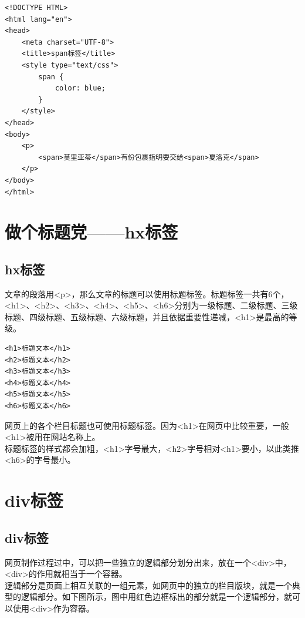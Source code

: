 \begin{lstlisting}[style=htmlcssjs]
<!DOCTYPE HTML>
<html lang="en">
<head>
    <meta charset="UTF-8">
    <title>span标签</title>
    <style type="text/css">
        span {
            color: blue;
        }
    </style>
</head>
<body>
    <p>
        <span>莫里亚蒂</span>有份包裹指明要交给<span>夏洛克</span>
    </p>
</body>
</html>
\end{lstlisting}

\newpage

\section{做个标题党——hx标签}

\subsection{hx标签}

文章的段落用<p>，那么文章的标题可以使用标题标签。标题标签一共有6个，<h1>、<h2>、<h3>、<h4>、<h5>、<h6>分别为一级标题、二级标题、三级标题、四级标题、五级标题、六级标题，并且依据重要性递减，<h1>是最高的等级。 \\

\begin{lstlisting}[style=htmlcssjs]
<h1>标题文本</h1>
<h2>标题文本</h2>
<h3>标题文本</h3>
<h4>标题文本</h4>
<h5>标题文本</h5>
<h6>标题文本</h6>
\end{lstlisting}

网页上的各个栏目标题也可使用标题标签。因为<h1>在网页中比较重要，一般<h1>被用在网站名称上。 \\

标题标签的样式都会加粗，<h1>字号最大，<h2>字号相对<h1>要小，以此类推<h6>的字号最小。

\newpage

\section{div标签}

\subsection{div标签}

网页制作过程过中，可以把一些独立的逻辑部分划分出来，放在一个<div>中，<div>的作用就相当于一个容器。 \\

逻辑部分是页面上相互关联的一组元素，如网页中的独立的栏目版块，就是一个典型的逻辑部分。如下图所示，图中用红色边框标出的部分就是一个逻辑部分，就可以使用<div>作为容器。 \\

